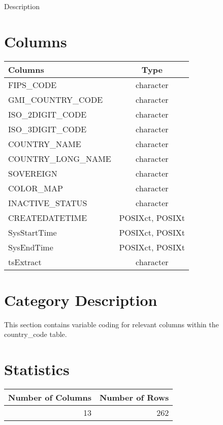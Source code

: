 \documentclass[
  letterpaper,
  DIV=11,
  numbers=noendperiod]{scrreprt}
\begin{document}
Description

\hypertarget{columns-5}{%
\section*{Columns}\label{columns-5}}

\begin{longtable}{lc}
\toprule
Columns & Type \\ 
\midrule
FIPS\_CODE & character \\ 
GMI\_COUNTRY\_CODE & character \\ 
ISO\_2DIGIT\_CODE & character \\ 
ISO\_3DIGIT\_CODE & character \\ 
COUNTRY\_NAME & character \\ 
COUNTRY\_LONG\_NAME & character \\ 
SOVEREIGN & character \\ 
COLOR\_MAP & character \\ 
INACTIVE\_STATUS & character \\ 
CREATEDATETIME & POSIXct, POSIXt \\ 
SysStartTime & POSIXct, POSIXt \\ 
SysEndTime & POSIXct, POSIXt \\ 
tsExtract & character \\ 
\bottomrule
\end{longtable}

\hypertarget{category-description-5}{%
\section*{Category Description}\label{category-description-5}}

This section contains variable coding for relevant columns within the
country\_code table.

\hypertarget{statistics-5}{%
\section*{Statistics}\label{statistics-5}}

\begin{longtable}{rr}
\toprule
Number of Columns & Number of Rows \\ 
\midrule
13 & 262 \\ 
\bottomrule
\end{longtable}
\end{document}

